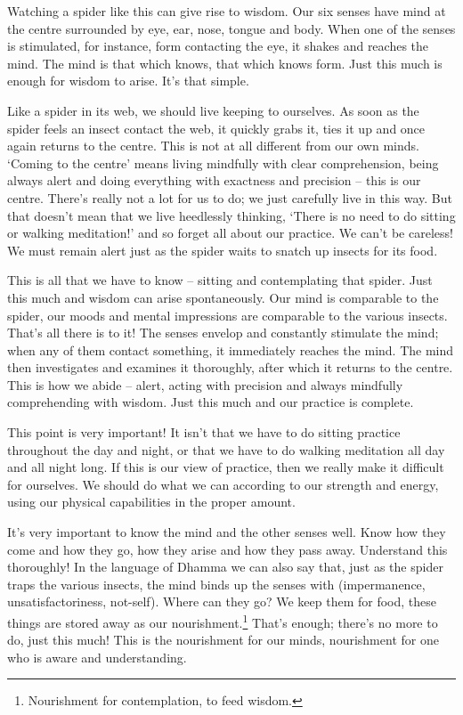 Watching a spider like this can give rise to wisdom. Our six senses have mind at the centre surrounded by eye, ear, nose, tongue and body. When one of the senses is stimulated, for instance, form contacting the eye, it shakes and reaches the mind. The mind is that which knows, that which knows form. Just this much is enough for wisdom to arise. It's that simple.

Like a spider in its web, we should live keeping to ourselves. As soon as the spider feels an insect contact the web, it quickly grabs it, ties it up and once again returns to the centre. This is not at all different from our own minds. `Coming to the centre' means living mindfully with clear comprehension, being always alert and doing everything with exactness and precision -- this is our centre. There's really not a lot for us to do; we just carefully live in this way. But that doesn't mean that we live heedlessly thinking, `There is no need to do sitting or walking meditation!' and so forget all about our practice. We can't be careless! We must remain alert just as the spider waits to snatch up insects for its food.

This is all that we have to know -- sitting and contemplating that spider. Just this much and wisdom can arise spontaneously. Our mind is comparable to the spider, our moods and mental impressions are comparable to the various insects. That's all there is to it! The senses envelop and constantly stimulate the mind; when any of them contact something, it immediately reaches the mind. The mind then investigates and examines it thoroughly, after which it returns to the centre. This is how we abide -- alert, acting with precision and always mindfully comprehending with wisdom. Just this much and our practice is complete.

This point is very important! It isn't that we have to do sitting practice throughout the day and night, or that we have to do walking meditation all day and all night long. If this is our view of practice, then we really make it difficult for ourselves. We should do what we can according to our strength and energy, using our physical capabilities in the proper amount.

It's very important to know the mind and the other senses well. Know how they come and how they go, how they arise and how they pass away. Understand this thoroughly! In the language of Dhamma we can also say that, just as the spider traps the various insects, the mind binds up the senses with  (impermanence, unsatisfactoriness, not-self). Where can they go? We keep them for food, these things are stored away as our nourishment.\footnote{Nourishment for contemplation, to feed wisdom.} That's enough; there's no more to do, just this much! This is the nourishment for our minds, nourishment for one who is aware and understanding.

